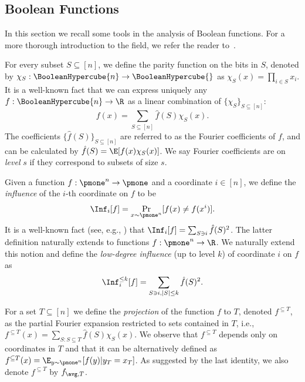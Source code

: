 \subsection{Boolean Functions}
In this section we recall some tools in the analysis of Boolean functions. For a more thorough introduction to the field, we refer the reader to~\cite{AOBFbook}. 

For every subset $S\subseteq[n]$, we define the parity function on the bits in $S$, denoted by $\chi_S: \BooleanHypercube{n} \to \BooleanHypercube{}$ as $\chi_S(x) = \prod_{i \in S}x_i$.  It is a well-known fact that we can express uniquely any $f: \BooleanHypercube{n} \to \R$ as a linear combination of $\{\chi_S\}_{S\subseteq[n]}$: 
$$f(x) = \sum_{S\subseteq[n]}\hat{f}(S)\chi_S(x).$$
The coefficients $\{\hat{f}(S)\}_{S\subseteq[n]}$ are referred to as the Fourier coefficients of $f$, and can be calculated by $\hat{f}(S) = \E[f(x)\chi_S(x)]$. We say Fourier coefficients are on \textit{level} $s$ if they correspond to subsets of size $s$.
%

Given a function $f:\pmone^n \to \pmone$ and a coordinate $i \in [n]$, we define the \emph{influence} of the  $i$-th coordinate on $f$ to be
$$
\Inf_i[f] = \Pr_{x\sim \pmone^n}[f(x) \neq f(x^i)].
$$
%
It is a well-known fact (see, e.g., \cite[Theorem~2.20]{AOBFbook}) that $\Inf_i[f] = \sum_{S \ni i} \hat f(S)^2$. The latter definition naturally extends to  functions $f: \pmone^n \to \R$. We naturally extend this notion and define the \emph{low-degree influence} (up to level $k$) of coordinate $i$ on $f$ as
$$
\Inf_i^{\leq k}[f] = \sum_{S \ni i, |S| \leq k} \hat f(S)^2.
$$
%

For a set $T \subseteq [n]$ we define the {\em projection} of the function $f$ to $T$, denoted $f^{\subseteq T}$, as the partial Fourier expansion restricted to sets contained in $T$, i.e., $f^{\subseteq T}(x) = \sum_{S: S \subseteq T} \hat{f}(S) \chi_S(x)$. We observe that $f^{\subseteq T}$ depends only on coordinates in $T$ and that it can be alternatively defined as $f^{\subseteq T}(x) =\E_{y\sim \pmone^n}[f(y)|y_T=x_T]$. As suggested by the last identity, we also denote $f^{\subseteq T}$ by $f_{\avg, T}$.


